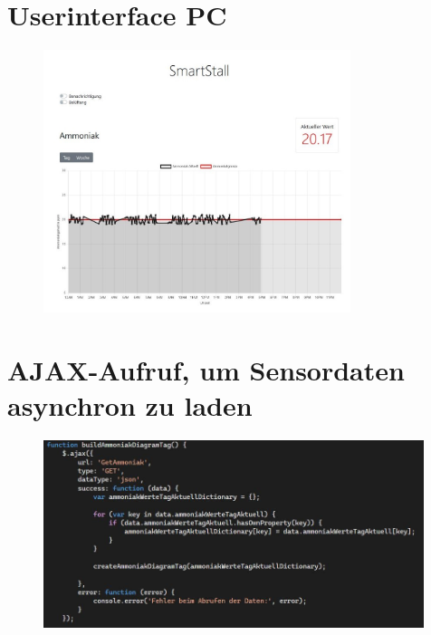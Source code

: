 \documentclass[conference]{IEEEtran}
\begin{document}
\begin{appendices}
\clearpage
\section{Userinterface PC}
\label{sec:uiPCAnhang}
\begin{figure}[h]
    \centering
    \includegraphics[width=0.8\textwidth]{fig/uiPC.jpg}
\end{figure}

\clearpage
\section{AJAX-Aufruf, um Sensordaten asynchron zu laden}
\label{sec:ajaxAnhang}
\begin{figure}[h]
    \centering
    \includegraphics[width=0.99\textwidth]{fig/ajax.JPG}
\end{figure}

\clearpage

\end{appendices}
\end{document}

